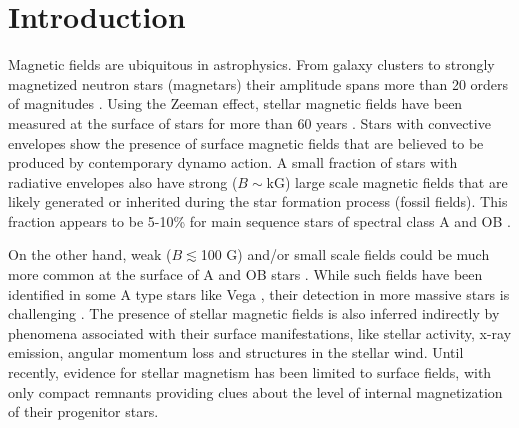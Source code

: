 \section{Introduction}
\label{intro}
Magnetic fields are ubiquitous in astrophysics. From  galaxy clusters to strongly magnetized neutron stars (magnetars) their amplitude spans more than 20 orders of magnitudes \citep{Brandenburg_2005}. Using the Zeeman effect, stellar magnetic fields have been measured at the surface of stars
for more than 60 years \citep{Babcock_1947,Landstreet_1992,Donati_2009}. Stars with convective envelopes show the presence of surface magnetic fields that are believed to be produced by contemporary dynamo action. A small fraction of stars with radiative envelopes also have strong ($B \! \sim$kG) large scale magnetic fields that are likely generated or inherited during the star formation process (fossil fields). This fraction appears to be 5-10\% for main sequence stars of spectral class A \citep[e.g.,][]{Auriere2004} and OB \citep{2012ASPC..464..405W}.

On the other hand, weak ($B \! \lesssim$100 G) and/or small scale fields could be much more common at the surface of A and OB stars \citep{Cantiello_2011,Braithwaite_2012}. While such fields have been identified in some A type stars like Vega \citep{Lignieres2009}, their detection in more massive stars is challenging \citep{2013A&A...554A..93K}. The presence of stellar magnetic fields is also inferred indirectly by phenomena associated with their surface manifestations, like stellar activity, x-ray emission, angular momentum loss and structures in the stellar wind. Until recently, evidence for stellar magnetism has been limited to surface fields, with only compact remnants providing clues about the level of internal magnetization of their progenitor stars.

